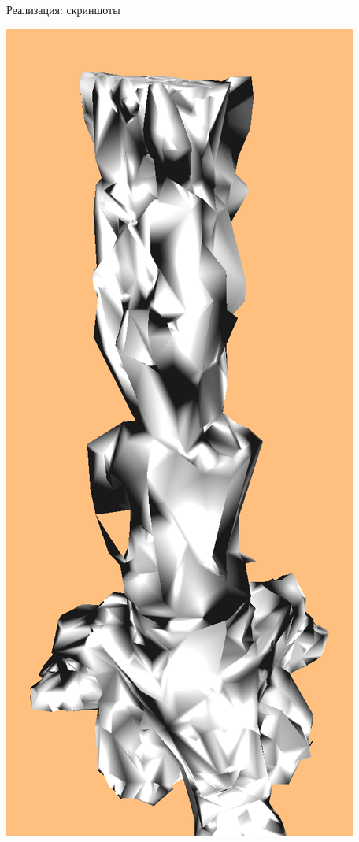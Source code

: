 \begin{frame}{Реализация: скриншоты}
\begin{center}
        \includegraphics[width=.2\textwidth]{demo-cut-3.png}
    \end{center}
\end{frame}
